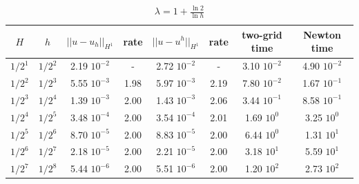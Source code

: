 \documentclass[12pt]{amsart}
\numberwithin{equation}{section}
\begin{document}
\begin{table} 
\begin{tabular}{|c|c|c|c|c|c|c|c|} \hline
$H$ & $h$ &$||u-u_h||_{H^1}$ & rate & $||u-u^h||_{H^1}$ & rate & two-grid time & Newton time\\ \hline
$1/2^1$ & $1/2^2$ &2.19 $10^{-2}$ & -      & 2.72 $10^{-2}$       & -       & 3.10 $10^{-2}$& 4.90 $10^{-2}$ \\ \hline
$1/2^2$ &$1/2^3$ & 5.55 $10^{-3}$ & 1.98 & 5.97 $10^{-3}$ & 2.19 & 7.80 $10^{-2}$ & 1.67 $10^{-1}$ \\ \hline
$1/2^3$ &$1/2^4$ &1.39 $10^{-3}$ &2.00   & 1.43 $10^{-3}$ & 2.06 & 3.44 $10^{-1}$ &8.58 $10^{-1}$\\ \hline
$1/2^4$ & $1/2^5$ &3.48 $10^{-4}$ & 2.00 & 3.54 $10^{-4}$ & 2.01 & 1.69 $10^{0}$&3.25 $10^{0}$\\ \hline
$1/2^5$ & $1/2^6$ & 8.70 $10^{-5}$ & 2.00 & 8.83 $10^{-5}$ & 2.00 & 6.44 $10^{0}$ & 1.31 $10^{1}$\\ \hline
$1/2^6$ & $1/2^7$ & 2.18 $10^{-5}$ &2.00 & 2.21 $10^{-5}$ & 2.00 & 3.18 $10^{1}$& 5.59 $10^{1}$\\ \hline
$1/2^7$ & $1/2^8$ & 5.44 $10^{-6}$ & 2.00 & 5.51 $10^{-6}$ & 2.00 &1.20 $10^{2}$& 2.73 $10^{2}$\\ \hline
\end{tabular}
\caption{ $\lambda=1+ \frac{ \ln 2}{\ln h} $} \label{tab2}
\end{table}

% 
%
%
\end{document}
